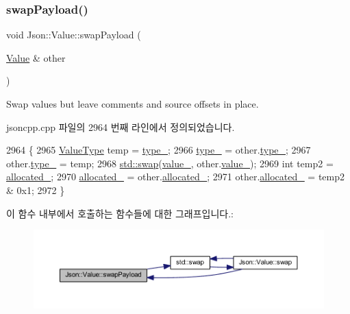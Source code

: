 \subsubsection{\texorpdfstring{swap\+Payload()}{swapPayload()}}
{\footnotesize\ttfamily void Json\+::\+Value\+::swap\+Payload (\begin{DoxyParamCaption}\item[{\hyperlink{class_json_1_1_value}{Value} \&}]{other }\end{DoxyParamCaption})}



Swap values but leave comments and source offsets in place. 



jsoncpp.\+cpp 파일의 2964 번째 라인에서 정의되었습니다.


\begin{DoxyCode}
2964                                     \{
2965   \hyperlink{namespace_json_a7d654b75c16a57007925868e38212b4e}{ValueType} temp = \hyperlink{class_json_1_1_value_abd222c2536dc88bf330dedcd076d2356}{type\_};
2966   \hyperlink{class_json_1_1_value_abd222c2536dc88bf330dedcd076d2356}{type\_} = other.\hyperlink{class_json_1_1_value_abd222c2536dc88bf330dedcd076d2356}{type\_};
2967   other.\hyperlink{class_json_1_1_value_abd222c2536dc88bf330dedcd076d2356}{type\_} = temp;
2968   \hyperlink{namespacestd_a22cc6fcbbb1f2f705c7888b615e43582}{std::swap}(\hyperlink{class_json_1_1_value_aef578244546212705b9f81eb84d7e151}{value\_}, other.\hyperlink{class_json_1_1_value_aef578244546212705b9f81eb84d7e151}{value\_});
2969   \textcolor{keywordtype}{int} temp2 = \hyperlink{class_json_1_1_value_ae0126c80dc4907aad94088553fc7632b}{allocated\_};
2970   \hyperlink{class_json_1_1_value_ae0126c80dc4907aad94088553fc7632b}{allocated\_} = other.\hyperlink{class_json_1_1_value_ae0126c80dc4907aad94088553fc7632b}{allocated\_};
2971   other.\hyperlink{class_json_1_1_value_ae0126c80dc4907aad94088553fc7632b}{allocated\_} = temp2 & 0x1;
2972 \}
\end{DoxyCode}
이 함수 내부에서 호출하는 함수들에 대한 그래프입니다.\+:\nopagebreak
\begin{figure}[H]
\begin{center}
\leavevmode
\includegraphics[width=350pt]{class_json_1_1_value_a5263476047f20e2fc6de470e4de34fe5_cgraph}
\end{center}
\end{figure}
